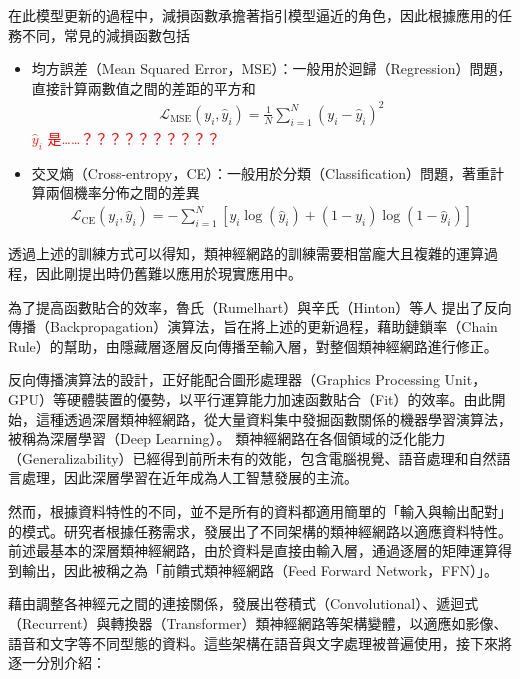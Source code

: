         在此模型更新的過程中，減損函數承擔著指引模型逼近的角色，因此根據應用的任務不同，常見的減損函數包括
\begin{itemize}
    \item 均方誤差（Mean Squared Error，MSE）：一般用於迴歸（Regression）問題，直接計算兩數值之間的差距的平方和
          \begin{align}
              \mathcal{L}_{\text{MSE}}(y_i, \hat{y}_i) = \frac{1}{N} \sum_{i=1}^{N} (y_i - \hat{y}_i)^2
          \end{align}
          \textcolor{red}{\(\hat{y}_i\) 是……？？？？？？？？？？}
    \item 交叉熵（Cross-entropy，CE）：一般用於分類（Classification）問題，著重計算兩個機率分佈之間的差異
          \begin{align}
              \mathcal{L}_{\text{CE}}(y_i, \hat{y}_i) = - \sum_{i=1}^{N} \left[ y_i \log(\hat{y}_i) + (1 - y_i) \log(1 - \hat{y}_i) \right]
          \end{align}
\end{itemize}

透過上述的訓練方式可以得知，類神經網路的訓練需要相當龐大且複雜的運算過程，因此剛提出時仍舊難以應用於現實應用中。

為了提高函數貼合的效率，魯氏（Rumelhart）與辛氏（Hinton）等人 \cite{rumelhart_learning_1986, rumelhart_learning_1987} 提出了反向傳播（Backpropagation）演算法，旨在將上述的更新過程，藉助鏈鎖率（Chain Rule）的幫助，由隱藏層逐層反向傳播至輸入層，對整個類神經網路進行修正。

反向傳播演算法的設計，正好能配合圖形處理器（Graphics Processing Unit，GPU）等硬體裝置的優勢，以平行運算能力加速函數貼合（Fit）的效率。由此開始，這種透過深層類神經網路，從大量資料集中發掘函數關係的機器學習演算法，被稱為深層學習（Deep Learning）。 類神經網路在各個領域的泛化能力（Generalizability）已經得到前所未有的效能，包含電腦視覺、語音處理和自然語言處理，因此深層學習在近年成為人工智慧發展的主流。

然而，根據資料特性的不同，並不是所有的資料都適用簡單的「輸入與輸出配對」的模式。研究者根據任務需求，發展出了不同架構的類神經網路以適應資料特性。前述最基本的深層類神經網路，由於資料是直接由輸入層，通過逐層的矩陣運算得到輸出，因此被稱之為「前饋式類神經網路（Feed Forward Network，FFN）」。

藉由調整各神經元之間的連接關係，發展出卷積式（Convolutional）、遞迴式（Recurrent）與轉換器（Transformer）類神經網路等架構變體，以適應如影像、語音和文字等不同型態的資料。這些架構在語音與文字處理被普遍使用，接下來將逐一分別介紹：

